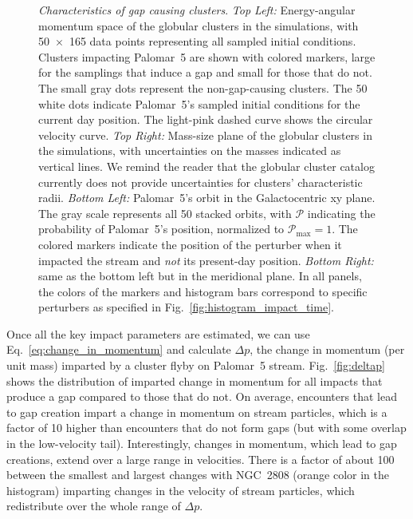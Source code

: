 \documentclass{aa}
\begin{document}
\begin{figure}
      \caption{\textit{Characteristics of gap causing clusters}. \textit{Top Left:} Energy-angular momentum space of the globular clusters in the simulations, with 50~$\times$~165 data points representing all sampled initial conditions. Clusters impacting Palomar~5 are shown with colored markers, large for the samplings that induce a gap and small for those that do not. The small gray dots represent the non-gap-causing clusters. The 50 white dots indicate Palomar~5's sampled initial conditions for the current day position. The light-pink dashed curve shows the circular velocity curve. \textit{Top Right:} Mass-size plane of the globular clusters in the simulations, with uncertainties on the masses indicated as vertical lines. We remind the reader that the globular cluster catalog currently does not provide uncertainties for clusters' characteristic radii. \textit{Bottom Left:} Palomar~5's orbit in the Galactocentric xy plane. The gray scale represents all 50 stacked orbits, with $\mathcal{P}$ indicating the probability of Palomar~5's position, normalized to $\mathcal{P}_\textrm{max}=1$. The colored markers indicate the position of the perturber when it impacted the stream and \textit{not} its present-day position. \textit{Bottom Right:} same as the bottom left but in the meridional plane. In all panels, the colors of the markers and histogram bars correspond to specific perturbers as specified in Fig.~\ref{fig:histogram_impact_time}.}
      \label{fig:mass_size_plane}
    \end{figure}

      
    Once all the key impact parameters are estimated, we can use Eq.~\ref{eq:change_in_momentum} and calculate $\Delta p$, the change in momentum (per unit mass) imparted by a cluster flyby on Palomar~5 stream. Fig.~\ref{fig:deltap} shows the distribution of imparted change in momentum for all impacts that produce a gap compared to those that do not. On average, encounters that lead to gap creation impart a change in momentum on stream particles, which is a factor of 10 higher than encounters that do not form gaps (but with some overlap in the low-velocity tail). Interestingly, changes in momentum, which lead to gap creations, extend over a large range in velocities. There is a factor of about 100 between the smallest and largest changes with NGC~2808 (orange color in the histogram) imparting changes in the velocity of stream particles, which redistribute over the whole range of $\Delta p$. 
\end{document}

